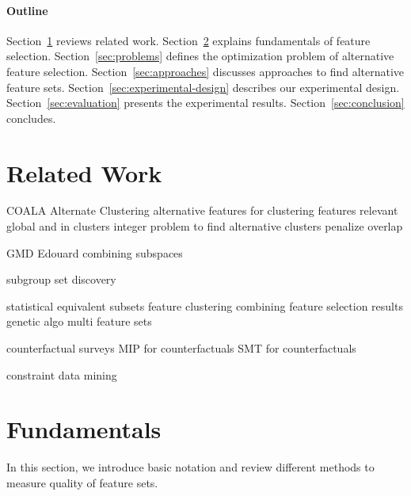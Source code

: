 \documentclass{article}
\theoremstyle{definition}
\begin{document}
\paragraph{Outline}

Section~\ref{sec:related-work} reviews related work.
Section~\ref{sec:fundamentals} explains fundamentals of feature selection.
Section~\ref{sec:problems} defines the optimization problem of alternative feature selection.
Section~\ref{sec:approaches} discusses approaches to find alternative feature sets.
Section~\ref{sec:experimental-design} describes our experimental design.
Section~\ref{sec:evaluation} presents the experimental results.
Section~\ref{sec:conclusion} concludes.

\section{Related Work}
\label{sec:related-work}

COALA \cite{bae2006coala}
Alternate Clustering \cite{bailey2014alternative}
alternative features for clustering \cite{tao2012novel}
features relevant global and in clusters \cite{guan2011unified}
integer problem to find alternative clusters \cite{bae2010clustering}
penalize overlap \cite{mueller2009relevant}

GMD \cite{trittenbach2019dimension}
Edouard \cite{fouche2021efficient}
combining subspaces \cite{nguyen20134s}

subgroup set discovery \cite{leeuwen2012diverse}

statistical equivalent subsets \cite{lagani2017feature, borboudakis2021extending, tsamardinos2003towards, dougherty2006number}
feature clustering \cite{mueller2021feature}
combining feature selection results \cite{woznica2012model}
genetic algo multi feature sets \cite{siddiqi2020genetic}

counterfactual surveys \cite{verma2020counterfactual, stepin2021survey}
MIP for counterfactuals \cite{mohammadi2021scaling}
SMT for counterfactuals \cite{karimi2020model}

constraint data mining \cite{grossi2017survey}

\section{Fundamentals}
\label{sec:fundamentals}

In this section, we introduce basic notation and review different methods to measure quality of feature sets.
\end{document}
